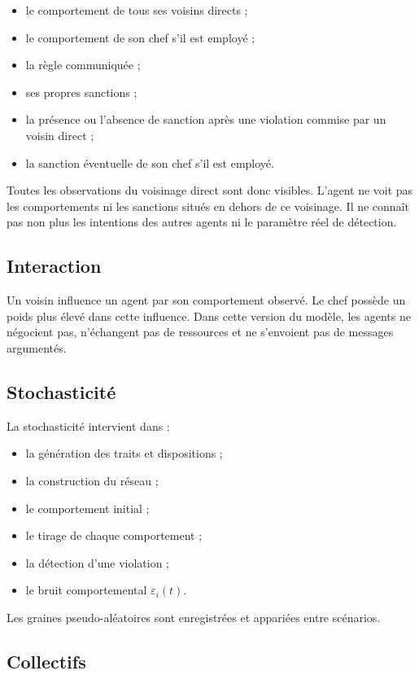 \documentclass[11pt,a4paper]{article}
\begin{document}
\begin{itemize}
  \item le comportement de tous ses voisins directs ;
  \item le comportement de son chef s’il est employé ;
  \item la règle communiquée ;
  \item ses propres sanctions ;
  \item la présence ou l’absence de sanction après une violation commise par un
  voisin direct ;
  \item la sanction éventuelle de son chef s’il est employé.
\end{itemize}

Toutes les observations du voisinage direct sont donc visibles. L’agent ne voit
pas les comportements ni les sanctions situés en dehors de ce voisinage. Il ne
connaît pas non plus les intentions des autres agents ni le paramètre réel de
détection.

\subsection{Interaction}

Un voisin influence un agent par son comportement observé. Le chef possède un
poids plus élevé dans cette influence. Dans cette version du modèle, les agents
ne négocient pas, n’échangent pas de ressources et ne s’envoient pas de messages
argumentés.

\subsection{Stochasticité}

La stochasticité intervient dans :

\begin{itemize}
  \item la génération des traits et dispositions ;
  \item la construction du réseau ;
  \item le comportement initial ;
  \item le tirage de chaque comportement ;
  \item la détection d’une violation ;
  \item le bruit comportemental $\varepsilon_i(t)$.
\end{itemize}

Les graines pseudo-aléatoires sont enregistrées et appariées entre scénarios.

\subsection{Collectifs}
\end{document}
